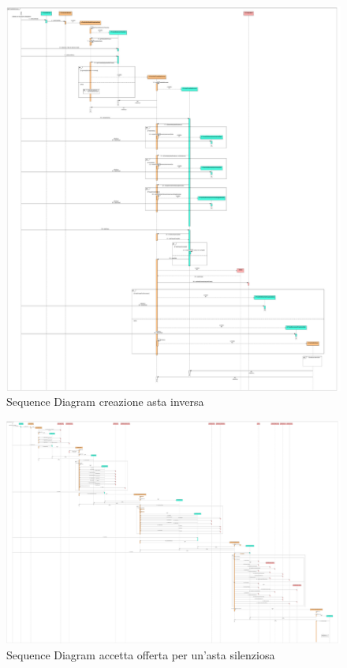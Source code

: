         \begin{figure}[htbp!]
        \centering
            \includegraphics[width=1\linewidth]{Immagini/Diagrammi/Sequence Diagram/CreaAstaInversa.pdf}
        \caption{Sequence Diagram creazione asta inversa}
        \end{figure}

        \begin{figure}[htbp!]
        \centering
            \includegraphics[width=1\linewidth]{Immagini/Diagrammi/Sequence Diagram/AccettaOffertaSilenziosa.pdf}
        \caption{Sequence Diagram accetta offerta per un'asta silenziosa}
        \end{figure}

